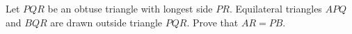 Let $PQR$ be an obtuse triangle with longest side $PR$. Equilateral triangles $APQ$ and $BQR$ are drawn outside triangle $PQR$. Prove that $AR=PB$.
